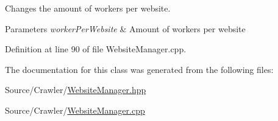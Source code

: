 Changes the amount of workers per website. 


\begin{DoxyParams}{Parameters}
{\em worker\+Per\+Website} & Amount of workers per website \\
\hline
\end{DoxyParams}


Definition at line 90 of file Website\+Manager.\+cpp.



The documentation for this class was generated from the following files\+:\begin{DoxyCompactItemize}
\item 
Source/\+Crawler/\hyperlink{_website_manager_8hpp}{Website\+Manager.\+hpp}\item 
Source/\+Crawler/\hyperlink{_website_manager_8cpp}{Website\+Manager.\+cpp}\end{DoxyCompactItemize}
